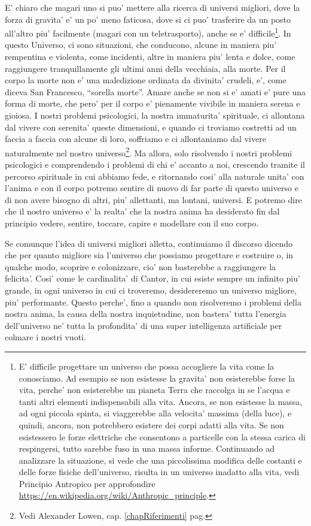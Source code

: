 E' chiaro che magari uno si puo' mettere alla ricerca di universi migliori, dove la forza di gravita' e' un po' meno faticosa, dove si ci puo' trasferire da un posto all'altro piu' facilmente (magari con un teletrasporto), anche se e' difficile\footnote{
E' difficile progettare un universo che possa accogliere la vita come la conosciamo. Ad esempio se non esistesse la gravita' non esisterebbe forse la vita, perche' non esisterebbe un pianeta Terra che raccolga in se l'acqua e tanti altri elementi indispensabili alla vita. Ancora, se non esistesse la massa, ad ogni piccola spinta, si viaggerebbe alla velocita' massima (della luce), e quindi, ancora, non potrebbero esistere dei corpi adatti alla vita. Se non esistessero le forze elettriche che consentono a particelle con la stessa carica di respingersi, tutto sarebbe fuso in una massa informe. Continuando ad analizzare la situazione, si vede che una piccolissima modifica delle costanti e delle forze fisiche dell'universo, risulta in un universo inadatto alla vita, vedi Principio Antropico per approfondire \url{https://en.wikipedia.org/wiki/Anthropic\_principle}.
}.
In questo Universo, ci sono situazioni, che conducono, alcune in maniera piu' rempentina e violenta, come incidenti, altre in maniera piu' lenta e dolce, come raggiungere tranquillamente gli ultimi anni della vecchiaia, alla morte. Per il corpo la morte non e' una maledizione ordinata da divinita' crudeli, e', come diceva San Francesco, ``sorella morte''. Amare anche se non si e' amati e' pure una forma di morte, che pero' per il corpo e' pienamente vivibile in maniera serena e gioiosa. I nostri problemi psicologici, la nostra immaturita' spirituale, ci allontana dal vivere con serenita' queste dimensioni, e quando ci troviamo costretti ad un faccia a faccia con alcune di loro, soffriamo e ci allontaniamo dal vivere naturalmente nel nostro universo\footnote{Vedi Alexander Lowen, cap. \ref{chapRiferimenti} pag. \pageref{chapRiferimenti}}.
Ma allora, solo risolvendo i nostri problemi psicologici e comprendendo i problemi di chi e' accanto a noi, crescendo tramite il percorso spirituale in cui abbiamo fede, e ritornando cosi' alla naturale unita' con l'anima e con il corpo potremo sentire di nuovo di far parte di questo universo e di non avere bisogno di altri, piu' allettanti, ma lontani, universi. E potremo dire che il nostro universo e' la realta' che la nostra anima ha desiderato fin dal principio vedere, sentire, toccare, capire e modellare con il suo corpo.

Se comunque l'idea di universi migliori alletta, continuiamo il discorso dicendo che per quanto migliore sia l'universo che possiamo progettare e costruire o, in qualche modo, scoprire e colonizzare, cio' non basterebbe a raggiungere la felicita'. Cosi' come le cardinalita' di Cantor, in cui esiste sempre un infinito piu' grande, in ogni universo in cui ci troveremo, desidereremo un universo migliore, piu' performante. Questo perche', fino a quando non risolveremo i problemi della nostra anima, la causa della nostra inquietudine, non bastera' tutta l'energia dell'universo ne' tutta la profondita' di una super intelligenza artificiale per colmare i nostri vuoti. 

